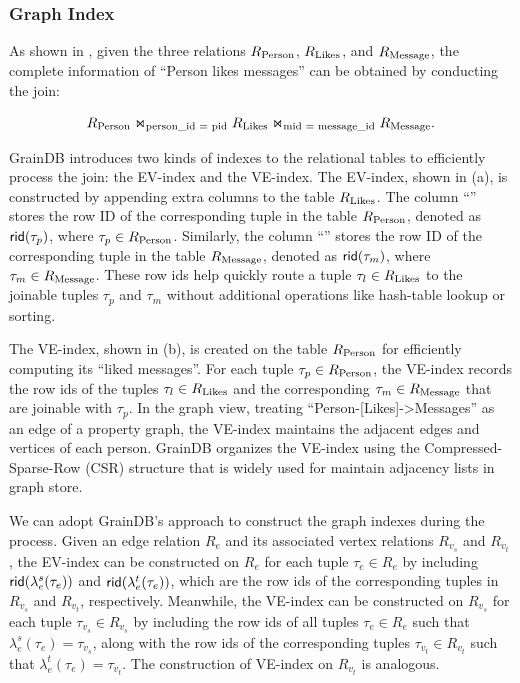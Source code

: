 \subsubsection{Graph Index}
\label{sec:graph-index}

As shown in , given the three relations ${R_{\text{Person}}}$, ${R_{\text{Likes}}}$, and ${R_{\text{Message}}}$, the complete information of ``Person likes messages'' can be obtained by conducting the join:

\[ {R_{\text{Person}}} \Join_\text{person\_id = pid} {\ensuremath R_{\text{Likes}}} \Join_\text{mid = message\_id} {\ensuremath R_{\text{Message}}}. \]

GrainDB introduces two kinds of indexes to the relational tables to efficiently process the join: the EV-index and the VE-index. The EV-index, shown in (a), is constructed by appending extra columns to the table ${R_{\text{Likes}}}$. The column ``'' stores the row ID of the corresponding tuple in the table ${R_{\text{Person}}}$, denoted as ${\mathsf{rid}}(\tau_{p})$, where $\tau_{p} \in {\ensuremath R_{\text{Person}}}$. Similarly, the column ``'' stores the row ID of the corresponding tuple in the table ${R_{\text{Message}}}$, denoted as ${\mathsf{rid}}(\tau_{m})$, where $\tau_{m} \in {\ensuremath R_{\text{Message}}}$. These row ids help quickly route a tuple $\tau_{l} \in {\ensuremath R_{\text{Likes}}}$ to the joinable tuples $\tau_{p}$ and $\tau_{m}$ without additional operations like hash-table lookup or sorting.

The VE-index, shown in (b), is created on the table ${R_{\text{Person}}}$ for efficiently computing its ``liked messages''. For each tuple $\tau_{p} \in {\ensuremath R_{\text{Person}}}$, the VE-index records the row ids of the tuples $\tau_{l} \in {\ensuremath R_{\text{Likes}}}$ and the corresponding $\tau_{m} \in {\ensuremath R_{\text{Message}}}$ that are joinable with $\tau_{p}$. In the graph view, treating ``Person-[Likes]->Messages'' as an edge of a property graph, the VE-index maintains the adjacent edges and vertices of each person. GrainDB organizes the VE-index using the Compressed-Sparse-Row (CSR) structure that is widely used for maintain adjacency lists in graph store.

We can adopt GrainDB's approach to construct the graph indexes during the \rgmapping process. Given an edge relation $R_e$ and its associated vertex relations $R_{v_s}$ and $R_{v_t}$, the EV-index can be constructed on $R_e$ for each tuple $\tau_e \in R_e$ by including ${\mathsf{rid}}(\lambda_e^s(\tau_e))$ and ${\mathsf{rid}}(\lambda_e^t(\tau_e))$, which are the row ids of the corresponding tuples in $R_{v_s}$ and $R_{v_t}$, respectively. Meanwhile, the VE-index can be constructed on $R_{v_s}$ for each tuple $\tau_{v_s} \in R_{v_s}$ by including the row ids of all tuples $\tau_e \in R_e$ such that $\lambda_e^s(\tau_e) = \tau_{v_s}$, along with the row ids of the corresponding tuples $\tau_{v_t} \in R_{v_t}$ such that $\lambda_e^t(\tau_e) = \tau_{v_t}$.
The construction of VE-index on $R_{v_t}$ is analogous.

